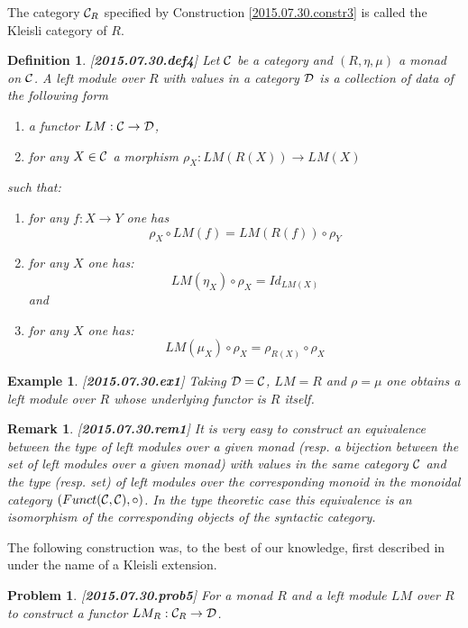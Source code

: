 \documentclass[11pt]{article}
\newtheorem{definition}[proposition]{Definition}
\newtheorem{example}[proposition]{Example}
\newtheorem{remark}[proposition]{Remark}
\newtheorem{problem}[proposition]{Problem}
\newcommand{\llabel}[1]{\label{#1}[{\bf #1}]}
\newcommand{\sr}{\rightarrow}
\begin{document}
%
The category ${\cal C}_R$ specified by Construction \ref{2015.07.30.constr3} is called the Kleisli category of $R$. 
%
\begin{definition}
\llabel{2015.07.30.def4}
Let $\cal C$ be a category and $(R,\eta,\mu)$ a monad on $\cal C$. A left module over $R$ with values in a category $\cal D$ is a collection of data of the following form
%
\begin{enumerate}
\item a functor $LM:{\cal C}\sr {\cal D}$,
\item for any $X\in {\cal C}$ a morphism $\rho_X:LM(R(X))\sr LM(X)$
\end{enumerate}
%
such that:
%
\begin{enumerate}
%
\item for any $f:X\sr Y$ one has 
%
$$\rho_X\circ LM(f)=LM(R(f))\circ \rho_Y$$
%
\item for any $X$ one has:
%
$$LM(\eta_X)\circ \rho_X=Id_{LM(X)}$$
%
and
\item for any $X$ one has:
%
$$LM(\mu_X)\circ \rho_X=\rho_{R(X)}\circ \rho_X$$
%
\end{enumerate}
\end{definition}
%
\begin{example}\rm
\llabel{2015.07.30.ex1}
Taking ${\cal D}={\cal C}$, $LM=R$ and $\rho=\mu$ one obtains a left module over $R$ whose underlying functor is $R$ itself. 
\end{example}
%
\begin{remark}\rm
\llabel{2015.07.30.rem1}
It is very easy to construct an equivalence between the type of left modules over a given monad (resp. a bijection between the set of left modules over a given monad) with values in the same category $\cal C$ and the type (resp. set) of left modules over the corresponding monoid in the monoidal category $(Funct({\cal C},{\cal C}),\circ)$. In the type theoretic case this equivalence is an isomorphism of the corresponding objects of the syntactic category. 
\end{remark}
%
The following construction was, to the best of our knowledge, first described in \cite[Def. 10, p.550]{HM2010} under the name of a Kleisli extension. 
%
\begin{problem}
\llabel{2015.07.30.prob5}
For a monad $R$ and a left module $LM$ over $R$ to construct a functor $LM_R:{\cal C}_R\sr {\cal D}$.
\end{problem}
%
\end{document}
